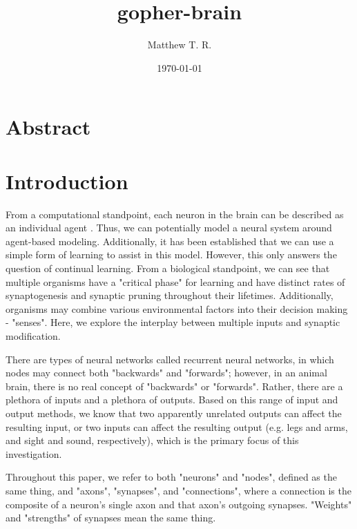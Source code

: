\documentclass[12pt]{article}
\begin{document}
\title{gopher-brain}
\author{Matthew T. R.}
\date{\today{}}
\maketitle{}

\newpage

\tableofcontents{}

\newpage

\section*{Abstract}

\section{Introduction}

From a computational standpoint, each neuron in the brain can be described as an individual agent \cite{agentbased}.  Thus, we can potentially model a neural system around agent-based modeling.  Additionally, it has been established that we can use a simple form of learning \cite{agentbased} to assist in this model.  However, this only answers the question of continual learning.  From a biological standpoint, we can see that multiple organisms have a "critical phase" for learning \cite{neurodev} and have distinct rates of synaptogenesis and synaptic pruning throughout their lifetimes.  Additionally, organisms may combine various environmental factors into their decision making - "senses".  Here, we explore the interplay between multiple inputs and synaptic modification.

There are types of neural networks called recurrent neural networks, in which nodes may connect both "backwards" and "forwards"; however, in an animal brain, there is no real concept of "backwards" or "forwards".  Rather, there are a plethora of inputs and a plethora of outputs.  Based on this range of input and output methods, we know that two apparently unrelated outputs can affect the resulting input, or two inputs can affect the resulting output (e.g. legs and arms, and sight and sound, respectively), which is the primary focus of this investigation.

Throughout this paper, we refer to both "neurons" and "nodes", defined as the same thing, and "axons", "synapses", and "connections", where a connection is the composite of a neuron's single axon and that axon's outgoing synapses.  "Weights" and "strengths" of synapses mean the same thing.
\end{document}
